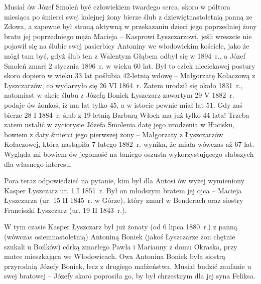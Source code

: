Musiał ów Józef Smoleń być człowiekiem twardego serca, skoro w półtora miesiąca po śmierci swej kolejnej żony bierze ślub z dziewiętnastoletnią panną ze Zdowa, a zapewne był stroną aktywną w przekazaniu dzieci jego poprzedniej żony bratu jej poprzedniego męża Macieja -- Kasprowi Łyszczarzowi, jeśli wreszcie nie pojawił się na ślubie swej pasierbicy Antoniny we włodowickim kościele, jako że mógł tam być, gdyż ślub ten z Walentym Głąbem odbył się w 1894~r., a Józef Smoleń zmarł 2 stycznia 1896~r. w wieku 60 lat. Był to człek nieciekawej postury skoro dopiero w wieku 33 lat poślubia 42-letnią wdowę -- Małgorzatę Kołaczową z Łyszczarzów, co wydarzyło się 26 VI 1864~r. Zatem urodził się około 1831~r., natomiast w akcie ślubu z Józefą Boniek Łyszczarz zawartym 29 V 1882~r. podaje ów żonkoś, iż ma lat tylko 45, a w istocie pewnie miał lat 51. Gdy zaś bierze 28 I 1884~r. ślub z 19-letnią Barbarą Włoch ma już tylko 44 lata! Trzeba zatem ustalić w życiorysie Józefa Smolenia datę jego urodzenia w Hucisku, bowiem z daty śmierci jego pierwszej żony -- Małgorzaty z Łyszczarzów Kołaczowej, która nastąpiła 7 lutego 1882~r. wynika, że miała wówczas aż 67 lat. Wygląda mi bowiem ów jegomość na taniego oszusta wykorzystującego słabszych dla własnego interesu.

Pora teraz odpowiedzieć na pytanie, kim był dla Antosi ów wyżej wymieniony Kasper Łyszczarz ur. 1 I 1851~r. Był on młodszym bratem jej ojca -- Macieja Łyszczarza (ur. 15 II 1845~r. w Górze), który zmarł w Benderach oraz siostry Franciszki Łyszczarz (ur. 19 II 1843~r.).

W tym czasie Kasper Łyszczarz był już żonaty (od 6 lipca 1880~r.) z panną (wówczas osiemnastoletnią) Antoniną Boniek (jakoś Łyszczarze żon chętnie szukali u Bońków) córką zmarłego Pawła i Marianny z domu Okraska, przy matce mieszkająca we Włodowicach. Owa Antonina Boniek była siostrą przyrodnią Józefy Boniek, lecz z drugiego małżeństwa. Musiał budzić zaufanie u swej bratowej -- Józefy skoro poprosiła go, by był chrzestnym dla jej syna Feliksa.

